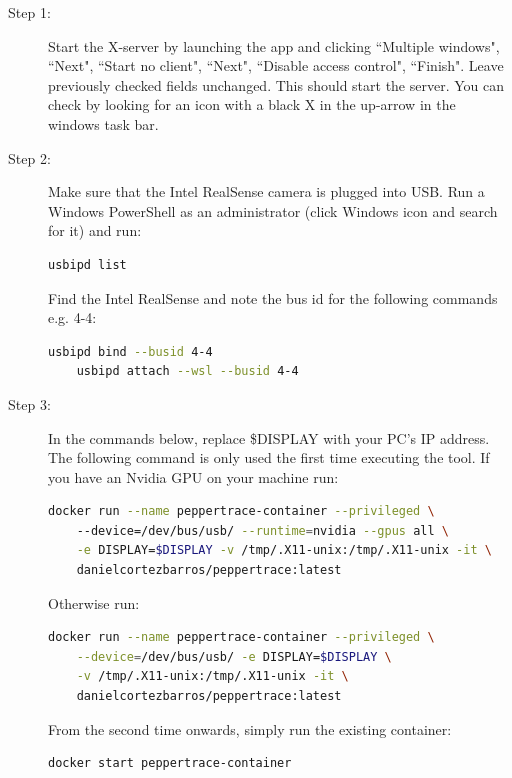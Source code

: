 \documentclass{CSSRforAfrica}
\begin{document}
\begin{description}
    \item[Step 1:] Start the X-server by launching the app and clicking ``Multiple windows", ``Next", ``Start no client", ``Next", ``Disable access control", ``Finish". Leave previously checked fields unchanged. This should start the server. You can check by looking for an icon with a black X in the up-arrow in the windows task bar.
    
    \item[Step 2:] Make sure that the Intel RealSense camera is plugged into USB. Run a Windows PowerShell as an administrator (click Windows icon and search for it) and run:
        \begin{lstlisting}[style=withoutNumbering, language=bash]
    usbipd list
        \end{lstlisting}
    Find the Intel RealSense and note the bus id for the following commands e.g. 4-4:
        \begin{lstlisting}[style=withoutNumbering, language=bash]
    usbipd bind --busid 4-4
    usbipd attach --wsl --busid 4-4
        \end{lstlisting}
    
    
    \item[Step 3:] In the commands below, replace \$DISPLAY with your PC's IP address. The following command is only used the first time executing the tool. If you have an Nvidia GPU on your machine run:
        \begin{lstlisting}[style=withoutNumbering, language=bash]
    docker run --name peppertrace-container --privileged \ 
    --device=/dev/bus/usb/ --runtime=nvidia --gpus all \
    -e DISPLAY=$DISPLAY -v /tmp/.X11-unix:/tmp/.X11-unix -it \
    danielcortezbarros/peppertrace:latest
        \end{lstlisting}
        Otherwise run:
        \begin{lstlisting}[style=withoutNumbering, language=bash]
    docker run --name peppertrace-container --privileged \
    --device=/dev/bus/usb/ -e DISPLAY=$DISPLAY \
    -v /tmp/.X11-unix:/tmp/.X11-unix -it \
    danielcortezbarros/peppertrace:latest
        \end{lstlisting}

        From the second time onwards, simply run the existing container:
        \begin{lstlisting}[style=withoutNumbering, language=bash]
    docker start peppertrace-container
        \end{lstlisting}
        

\end{description}
\end{document}
